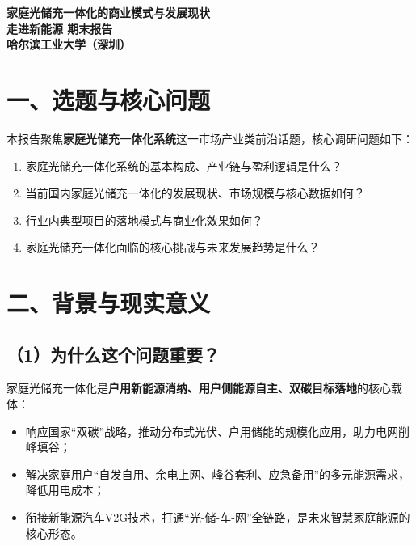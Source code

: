 \documentclass[12pt,a4paper,UTF8]{ctexart}
\begin{document}
\begin{titlepage}
    \centering
    \vspace*{3cm}
    \Huge\bfseries 家庭光储充一体化的商业模式与发展现状\\
    \vspace{1cm}
    \Large\bfseries 走进新能源 期末报告\\
    \vfill
    \Large 哈尔滨工业大学（深圳）
\end{titlepage}

\section*{一、选题与核心问题}
本报告聚焦\textbf{家庭光储充一体化系统}这一市场产业类前沿话题，核心调研问题如下：
\begin{enumerate}
    \item 家庭光储充一体化系统的基本构成、产业链与盈利逻辑是什么？
    \item 当前国内家庭光储充一体化的发展现状、市场规模与核心数据如何？
    \item 行业内典型项目的落地模式与商业化效果如何？
    \item 家庭光储充一体化面临的核心挑战与未来发展趋势是什么？
\end{enumerate}

\section*{二、背景与现实意义}
\subsection*{（1）为什么这个问题重要？}
家庭光储充一体化是\textbf{户用新能源消纳、用户侧能源自主、双碳目标落地}的核心载体：
\begin{itemize}
    \item 响应国家“双碳”战略，推动分布式光伏、户用储能的规模化应用，助力电网削峰填谷；
    \item 解决家庭用户“自发自用、余电上网、峰谷套利、应急备用”的多元能源需求，降低用电成本；
    \item 衔接新能源汽车V2G技术，打通“光-储-车-网”全链路，是未来智慧家庭能源的核心形态。
\end{itemize}
\end{document}
